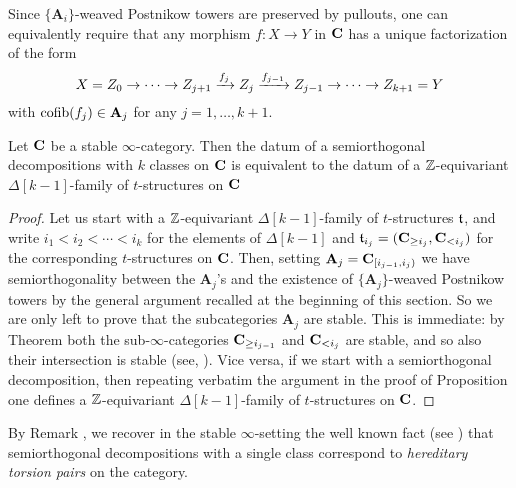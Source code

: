 \begin{remark}
Since $\{\mathbf{A}_i\}$\hyp{}weaved Postnikow towers are preserved by pullouts, one can equivalently require that any morphism $f\colon X\to Y$ in $\textbf{C}$ has a unique factorization of the form 
\[
X =Z_0\to\cdots \to Z_{j+1} \xrightarrow{f_{j}} Z_{j} \xrightarrow{f_{j-1}}Z_{j-1}\to \cdots\to Z_{k+1}=Y
\]
with $\text{cofib}(f_j)\in \mathbf{A}_j$ for any $j=1,\dots, k+1$. 
\end{remark} 
\begin{theorem}\label{what.s.semiortho}
Let $\textbf{C}$ be a stable $\infty$\hyp{}category. Then the datum of a semiorthogonal decompositions with $k$ classes on $\textbf{C}$ is equivalent to the datum of a $\mathbb{Z} $\hyp{}equivariant $\Delta[k-1]$\hyp{}family of $t$\hyp{}structures on $\textbf{C}$
\end{theorem}
\begin{proof}
Let us start with a $\mathbb{Z} $\hyp{}equivariant $\Delta[k-1]$\hyp{}family of $t$\hyp{}structures $\mathfrak{t}$, and write $i_1<i_2<\cdots<i_k$ for the elements of $\Delta[k-1]$ and $\mathfrak{t}_{i_j}=(\textbf{C}_{\geq i_j},\textbf{C}_{<i_j})$ for the corresponding $t$\hyp{}structures on $\textbf{C}$. Then, setting $\mathbf{A}_j=\textbf{C}_{[i_{j-1}, i_j)}$ we have semiorthogonality between the $\mathbf{A}_j$'s and the existence of $\{\mathbf{A}_j\}$\hyp{}weaved Postnikow towers by the general argument recalled at the beginning of this section. So we are only left to prove that the subcategories $\mathbf{A}_j$ are stable. This is immediate: by Theorem  both the sub\hyp{}$\infty$\hyp{}categories $\textbf{C}_{\geq i_{j-1}}$ and $\textbf{C}_{<i_j}$ are stable, and so also their intersection is stable (see, \cite{LurieHA}). Vice versa, if we start with a semiorthogonal decomposition, then repeating verbatim the argument in the proof of Proposition  one defines 
a $\mathbb{Z} $\hyp{}equivariant $\Delta[k-1]$\hyp{}family of $t$\hyp{}structures on $\textbf{C}$.
\end{proof}
\begin{remark}By Remark , we recover in the stable $\infty$\hyp{}setting the well known fact (see \cite[\textbf{IV.4}]{Beligiannisreiten}) that semiorthogonal decompositions with a single class correspond to \emph{hereditary torsion pairs} on the category.
\end{remark}
